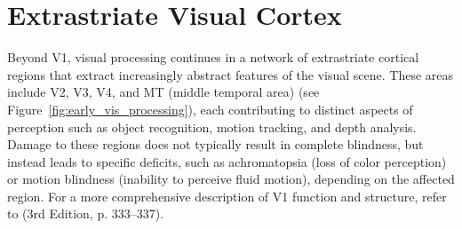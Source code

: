 \section{Extrastriate Visual Cortex}
\label{sec:extrastriate}

Beyond V1, visual processing continues in a network of extrastriate cortical regions that extract increasingly abstract features of the visual scene. These areas include V2, V3, V4, and MT (middle temporal area) (see Figure~\ref{fig:early_vis_processing}), each contributing to distinct aspects of perception such as object recognition, motion tracking, and depth analysis. Damage to these regions does not typically result in complete blindness, but instead leads to specific deficits, such as achromatopsia (loss of color perception) or motion blindness (inability to perceive fluid motion), depending on the affected region. For a more comprehensive description of V1 function and structure, refer to \citet{bear2020neuroscience} (3rd Edition, p. 333--337).